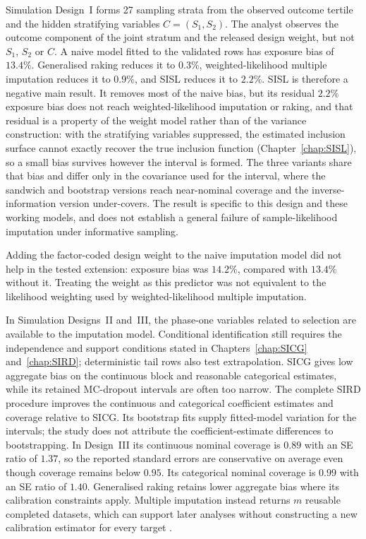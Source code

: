 Simulation Design~I forms 27 sampling strata from the observed outcome tertile and the hidden stratifying variables $C=(S_1,S_2)$. The analyst observes the outcome component of the joint stratum and the released design weight, but not $S_1$, $S_2$ or $C$. A naive model fitted to the validated rows has exposure bias of $13.4\%$. Generalised raking reduces it to $0.3\%$, weighted-likelihood multiple imputation reduces it to $0.9\%$, and SISL reduces it to $2.2\%$. SISL is therefore a negative main result. It removes most of the naive bias, but its residual $2.2\%$ exposure bias does not reach weighted-likelihood imputation or raking, and that residual is a property of the weight model rather than of the variance construction: with the stratifying variables suppressed, the estimated inclusion surface cannot exactly recover the true inclusion function (Chapter~\ref{chap:SISL}), so a small bias survives however the interval is formed. The three variants share that bias and differ only in the covariance used for the interval, where the sandwich and bootstrap versions reach near-nominal coverage and the inverse-information version under-covers. The result is specific to this design and these working models, and does not establish a general failure of sample-likelihood imputation under informative sampling.

Adding the factor-coded design weight to the naive imputation model did not help in the tested extension: exposure bias was $14.2\%$, compared with $13.4\%$ without it. Treating the weight as this predictor was not equivalent to the likelihood weighting used by weighted-likelihood multiple imputation.

In Simulation Designs~II and~III, the phase-one variables related to selection are available to the imputation model. Conditional identification still requires the independence and support conditions stated in Chapters~\ref{chap:SICG} and~\ref{chap:SIRD}; deterministic tail rows also test extrapolation. SICG gives low aggregate bias on the continuous block and reasonable categorical estimates, while its retained MC-dropout intervals are often too narrow. The complete SIRD procedure improves the continuous and categorical coefficient estimates and coverage relative to SICG. Its bootstrap fits supply fitted-model variation for the intervals; the study does not attribute the coefficient-estimate differences to bootstrapping. In Design~III its continuous nominal coverage is $0.89$ with an SE ratio of $1.37$, so the reported standard errors are conservative on average even though coverage remains below $0.95$. Its categorical nominal coverage is $0.99$ with an SE ratio of $1.40$. Generalised raking retains lower aggregate bias where its calibration constraints apply. Multiple imputation instead returns $m$ reusable completed datasets, which can support later analyses without constructing a new calibration estimator for every target \citep{Rubin1987,breslow2009improved,han2021combining}.

